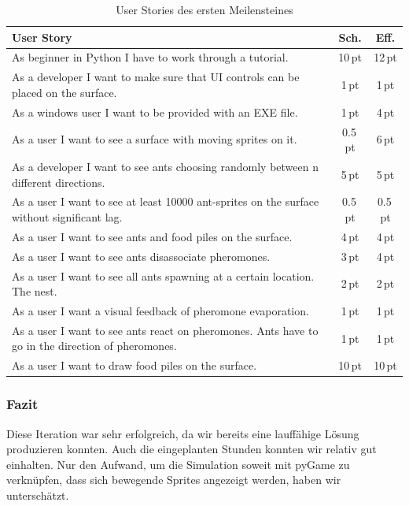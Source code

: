\begin{table}[H]
\small\sffamily\renewcommand{\arraystretch}{1.5}
\begin{tabular}{| p{12cm} | c | c |}
  \hline
  \bfseries{User Story} & \bfseries{Sch.} & \bfseries{Eff.}  \\
  \hline
  As beginner in Python I have to work through a tutorial. & 10\,pt & 12\,pt \\
  \hline
  As a developer I want to make sure that UI controls can be placed on the
surface. & 1\,pt &1\,pt \\
  \hline
  As a windows user I want to be provided with an EXE file. & 1\,pt &4\,pt \\
  \hline
  As a user I want to see a surface with moving sprites on it. & 0.5\,pt & 6\,pt
\\
  \hline
  As a developer I want to see ants choosing randomly between n different
directions. & 5\,pt & 5\,pt \\
  \hline
  As a user I want to see at least 10000 ant-sprites on the surface without
significant lag. & 0.5\,pt & 0.5\,pt \\
  \hline
  As a user I want to see ants and food piles on the surface. & 4\,pt & 4\,pt \\
  \hline
  As a user I want to see ants disassociate pheromones. & 3\,pt & 4\,pt \\
  \hline
  As a user I want to see all ants spawning at a certain location. The nest. &
2\,pt & 2\,pt \\
  \hline
  As a user I want a visual feedback of pheromone evaporation. & 1\,pt & 1\,pt
\\
  \hline
  As a user I want to see ants react on pheromones. Ants have to go in the
direction of pheromones. & 1\,pt & 1\,pt \\
  \hline
  As a user I want to draw food piles on the surface. & 10\,pt & 10\,pt \\
  \hline
\end{tabular}
\captionsetup{type=table} %
\caption{User Stories des ersten Meilensteines}
\end{table}

\subsubsection*{Fazit}

Diese Iteration war sehr erfolgreich, da wir bereits eine lauffähige Lösung produzieren
konnten. Auch die eingeplanten Stunden konnten wir relativ gut einhalten. Nur den
Aufwand, um die Simulation soweit mit pyGame zu verknüpfen, dass sich bewegende Sprites
angezeigt werden, haben wir unterschätzt.

